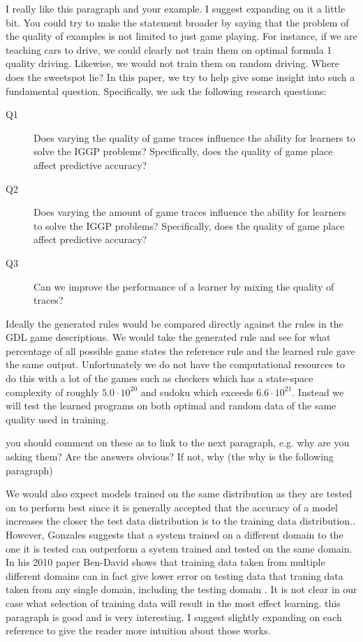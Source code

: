 \ac{
I really like this paragraph and your example.
I suggest expanding on it a little bit.
You could try to make the statement broader by saying that the problem of the quality of examples is not limited to just game playing.
For instance, if we are teaching cars to drive, we could clearly not train them on optimal formula 1 quality driving.
Likewise, we would not train them on random driving.
Where does the sweetspot lie?
In this paper, we try to help give some insight into such a fundamental question.
Specifically, we ask the following research questions:
}

\begin{description}
\item[Q1] Does varying the quality of game traces influence the ability for learners to solve the IGGP problems? Specifically, does the quality of game place affect predictive accuracy?
\item[Q2] Does varying the amount of game traces influence the ability for learners to solve the IGGP problems? Specifically, does the quality of game place affect predictive accuracy?
\item[Q3] Can we improve the performance of a learner by mixing the quality of traces?
\end{description}

Ideally the generated rules would be compared directly against the rules in the GDL game descriptions. We would take the generated rule and see for what percentage of all possible game states the reference rule and the learned rule gave the same output. Unfortunately we do not have the computational resources to do this with a lot of the games such as checkers which has a state-space complexity of roughly $5.0 \cdot 10^{20}$\cite{Horssen/Checkers} and sudoku which exceeds $6.6 \cdot 10^{21}$\cite{Felgenhauer/Suduko}. Instead we will test the learned programs on both optimal and random data of the same quality used in training.

\ac{you should comment on these as to link to the next paragraph, e.g. why are you asking them? Are the answers obvious? If not, why (the why is the following paragraph)}

We would also expect models trained on the same distribution as they are tested on to perform best since it is generally accepted that the accuracy of a model increases the closer the test data distribution is to the training data distribution.\cite{Mitchell/MachineLearing}. However, Gonzales \cite{Gonzalez/MismatchedOutperform} suggests that a system trained on a different domain to the one it is tested can outperform a system trained and tested on the same domain. In his 2010 paper Ben-David shows that training data taken from multiple different domains can in fact give lower error on testing data that traning data taken from any single domain, including the testing domain \cite{Ben-David/DifferentDomains}. It is not clear in our case what selection of training data will result in the most effect learning.
\ac{this paragraph is good and is very interesting. I suggest slightly expanding on each reference to give the reader more intuition about those works}.

